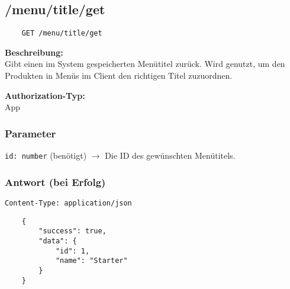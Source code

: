 \subsection{/menu/title/get}

\begin{lstlisting}
    GET /menu/title/get
\end{lstlisting}

\textbf{Beschreibung:} \\
Gibt einen im System gespeicherten Menütitel zurück. Wird genutzt, um den Produkten in Menüs im Client den richtigen Titel zuzuordnen.

\textbf{Authorization-Typ:} \\
App

\subsubsection{Parameter}

\lstinline{id: number} (benötigt)
$\rightarrow$ Die ID des gewünschten Menütitels.

\subsubsection{Antwort (bei Erfolg)}

\lstinline{Content-Type: application/json}
\begin{lstlisting}
    {
        "success": true, 
        "data": {
            "id": 1,
            "name": "Starter"
        }
    }
\end{lstlisting}
